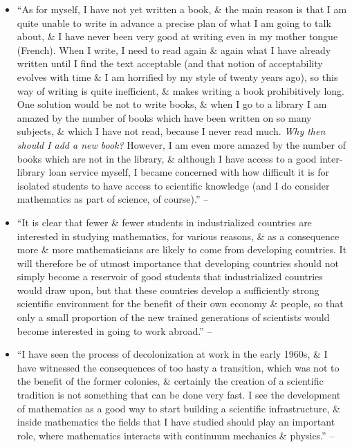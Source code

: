 \documentclass{article}
\begin{document}
\begin{enumerate}
\begin{itemize}
		\item ``As for myself, I have not yet written a book, \& the main reason is that I am quite unable to write in advance a precise plan of what I am going to talk about, \& I have never been very good at writing even in my mother tongue (French). When I write, I need to read again \& again what I have already written until I find the text acceptable (and that notion of acceptability evolves with time \& I am horrified by my style of twenty years ago), so this way of writing is quite inefficient, \& makes writing a book prohibitively long. One solution would be not to write books, \& when I go to a library I am amazed by the number of books which have been written on so many subjects, \& which I have not read, because I never read much. \textit{Why then should I add a new book?} However, I am even more amazed by the number of books which are not in the library, \& although I have access to a good inter-library loan service myself, I became concerned with how difficult it is for isolated students to have access to scientific knowledge (and I do consider mathematics as part of science, of course).'' -- \cite[Preface, p. ix]{Tartar2006}
		\item ``It is clear that fewer \& fewer students in industrialized countries are interested in studying mathematics, for various reasons, \& as a consequence more \& more mathematicians are likely to come from developing countries. It will therefore be of utmost importance that developing countries should not simply become a reservoir of good students that industrialized countries would draw upon, but that these countries develop a sufficiently strong scientific environment for the benefit of their own economy \& people, so that only a small proportion of the new trained generations of scientists would become interested in going to work abroad.'' -- \cite[Preface, p. ix]{Tartar2006}
		\item ``I have seen the process of decolonization at work in the early 1960s, \& I have witnessed the consequences of too hasty a transition, which was not to the benefit of the former colonies, \& certainly the creation of a scientific tradition is not something that can be done very fast. I see the development of mathematics as a good way to start building a scientific infrastructure, \& inside mathematics the fields that I have studied should play an important role, where mathematics interacts with continuum mechanics \& physics.'' -- \cite[Preface, pp. ix--x]{Tartar2006}

\end{itemize}
\end{enumerate}
\end{document}
